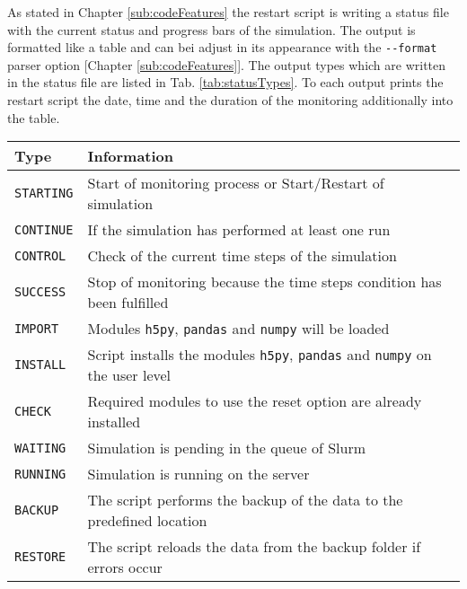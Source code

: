 As stated in Chapter \ref{sub:codeFeatures} the restart script is writing a status file with the current status and progress bars of the simulation. The output is formatted like a table and can bei adjust in its appearance with the \texttt{-\/-format} parser option [Chapter \ref{sub:codeFeatures}]. The output types which are written in the status file are listed in Tab. \ref{tab:statusTypes}. To each output prints the restart script the date, time and the duration of the monitoring additionally into the table. 
\begin{center}
    \captionsetup{type=table}
    \begin{tabular}{l | l}
        Type              & Information                                                                                     \\\hline
        \texttt{STARTING} & Start of monitoring process or Start/Restart of simulation                                      \\
        \texttt{CONTINUE} & If the simulation has performed at least one run                                                \\\hline
        \texttt{CONTROL}  & Check of the current time steps of the simulation                                               \\
        \texttt{SUCCESS}  & Stop of monitoring because the time steps condition has been fulfilled                          \\\hline
        \texttt{IMPORT}   & Modules \texttt{h5py}, \texttt{pandas} and \texttt{numpy} will be loaded                        \\
        \texttt{INSTALL}  & Script installs the modules \texttt{h5py}, \texttt{pandas} and \texttt{numpy} on the user level \\
        \texttt{CHECK}    & Required modules to use the reset option are already installed                                  \\\hline
        \texttt{WAITING}  & Simulation is pending in the queue of Slurm                                                     \\
        \texttt{RUNNING}  & Simulation is running on the server                                                             \\\hline
        \texttt{BACKUP}   & The script performs the backup of the data to the predefined location                           \\
        \texttt{RESTORE}  & The script reloads the data from the backup folder if errors occur                              \\

\end{tabular}
\end{center}

